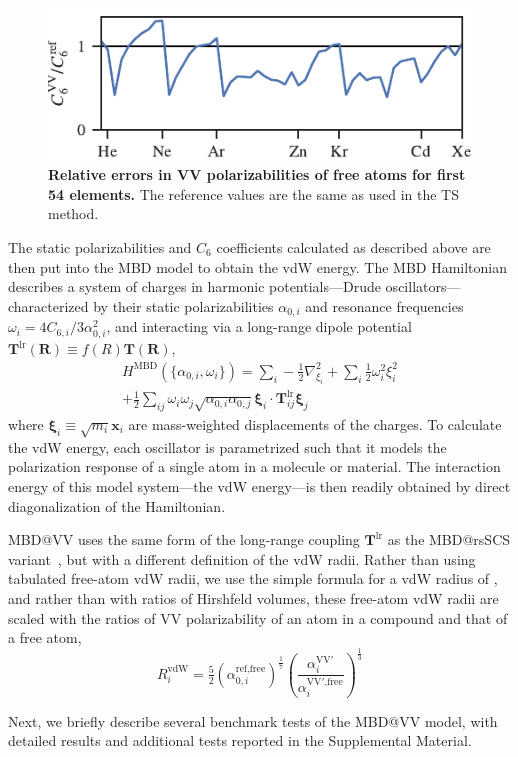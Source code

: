 \begin{figure}[t!]
\centering
\includegraphics{../media/vv-periodic-table.pdf}
\caption{\textbf{Relative errors in VV polarizabilities of free atoms for first 54 elements.}
The reference values are the same as used in the TS method.
}\label{fig:vv-periodic-table}
\end{figure}

The static polarizabilities and $C_6$ coefficients calculated as described above are then put into the MBD model to obtain the vdW energy.
The MBD Hamiltonian describes a system of charges in harmonic potentials---Drude oscillators---characterized by their static polarizabilities $\alpha_{0,i}$ and resonance frequencies $\omega_i=4C_{6,i}/3\alpha_{0,i}^2$, and interacting via a long-range dipole potential $\mathbf T^\mathrm{lr}(\mathbf R)\equiv f(R)\mathbf T(\mathbf R)$,
\begin{multline}
  H^\text{MBD}(\{\alpha_{0,i},\omega_i\})=\sum_i-\frac12\nabla_{\xi_i}^2+\sum_i\frac12\omega_i^2\xi_i^2 \\
  +\frac12\sum_{ij}\omega_i\omega_j\sqrt{\alpha_{0,i}\alpha_{0,j}}\boldsymbol{\xi}_i\cdot\mathbf T^\mathrm{lr}_{ij}\boldsymbol{\xi}_j
\end{multline}
where $\boldsymbol\xi_i\equiv\sqrt{m_i}\mathbf x_i$ are mass-weighted displacements of the charges.
To calculate the vdW energy, each oscillator is parametrized such that it models the polarization response of a single atom in a molecule or material.
The interaction energy of this model system---the vdW energy---is then readily obtained by direct diagonalization of the Hamiltonian.

MBD@VV uses the same form of the long-range coupling $\mathbf T^\text{lr}$ as the MBD@rsSCS variant~\citep{AmbrosettiJCP14}, but with a different definition of the vdW radii.
Rather than using tabulated free-atom vdW radii, we use the simple formula for a vdW radius of \citet{FedorovPRL18}, and rather than with ratios of Hirshfeld volumes, these free-atom vdW radii are scaled with the ratios of VV polarizability of an atom in a compound and that of a free atom,\begin{equation}
  R_i^\text{vdW}=\tfrac52{(\alpha_{0,i}^\text{ref,free})}^\frac17{\left(\frac{\alpha_i^\mathrm{VV'}}{\alpha_i^\text{VV$'$,free}}\right)}^\frac13
\end{equation}

Next, we briefly describe several benchmark tests of the MBD@VV model, with detailed results and additional tests reported in the Supplemental Material.
